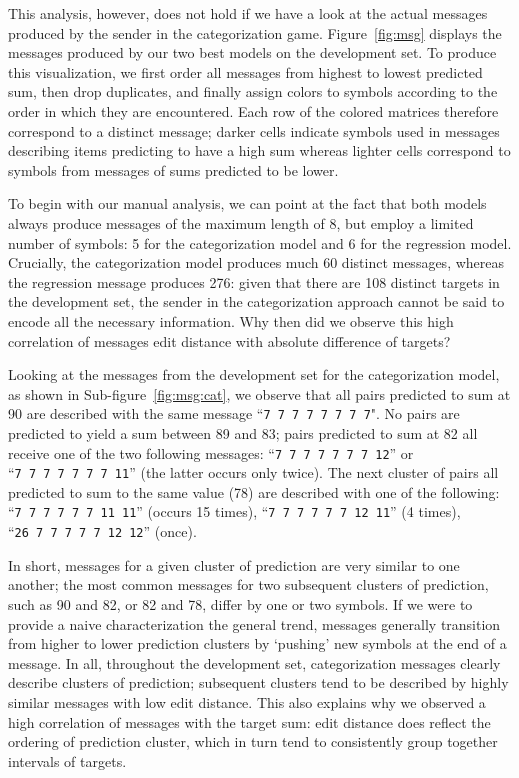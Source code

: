 \documentclass[twocolumn]{article}
\begin{document}
This analysis, however, does not hold if we have a look at the actual messages produced by the sender in the categorization game.
Figure~\ref{fig:msg} displays the messages produced by our two best models on the development set. 
To produce this visualization, we first order all messages from highest to lowest predicted sum, then drop duplicates, and finally assign colors to symbols according to the order in which they are encountered.
Each row of the colored matrices therefore correspond to a distinct message; darker cells indicate symbols used in messages describing items predicting to have a high sum whereas lighter cells correspond to symbols from messages of sums predicted to be lower.

To begin with our manual analysis, we can point at the fact that both models always produce messages of the maximum length  of 8, but employ a limited number of symbols: 5 for the categorization model and 6 for the regression model.
Crucially, the categorization model produces much 60 distinct messages, whereas the regression message produces 276: given that there are 108 distinct targets in the development set, the sender in the categorization approach cannot be said to encode all the necessary information. 
Why then did we observe this high correlation of messages edit distance with absolute difference of targets?

Looking at the messages from the development set for the categorization model, as shown in Sub-figure~\ref{fig:msg:cat}, we observe that all pairs predicted to sum at 90 are described with the same message ``\textcolor{Blues-K}{\tt 7~7~7~7~7~7~7~7}". %
No pairs are predicted to yield a sum between 89 and 83; pairs predicted to sum at 82 all receive one of the two following messages: ``{\tt \textcolor{Blues-K}{7~7~7~7~7~7~7}~\textcolor{Blues-I}{12}}'' or ``{\tt \textcolor{Blues-K}{7~7~7~7~7~7~7}~\textcolor{Blues-G}{11}}'' (the latter occurs only twice).
The next cluster of pairs all predicted to sum to the same value (78) are described with one of the following: ``{\tt \textcolor{Blues-K}{7~7~7~7~7~7}~\textcolor{Blues-G}{11~11}}'' (occurs 15 times), ``{\tt \textcolor{Blues-K}{7~7~7~7~7~7}~\textcolor{Blues-I}{12}~\textcolor{Blues-G}{11}}'' (4 times),  ``{\tt \textcolor{Blues-F}{26}~\textcolor{Blues-K}{7~7~7~7~7}~\textcolor{Blues-I}{12~12}}'' (once).

In short, messages for a given cluster of prediction are very similar to one another; the most common messages for two subsequent clusters of prediction, such as 90 and 82, or 82 and 78, differ by one or two symbols.
If we were to provide a naive characterization the general trend, messages generally transition from higher to lower prediction clusters by `pushing' new symbols at the end of a message.
In all, throughout the development set, categorization messages clearly describe clusters of prediction; subsequent clusters tend to be described by highly similar messages with low edit distance.
This also explains why we observed a high correlation of messages with the target sum: edit distance does reflect the ordering of prediction cluster, which in turn tend to consistently group together intervals of targets.
\end{document}
